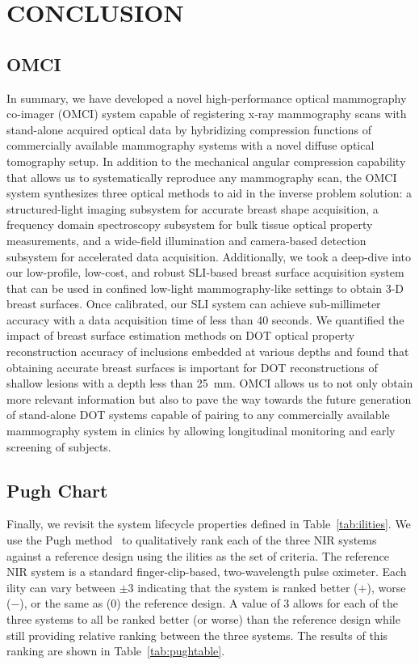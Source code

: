 \chapter{CONCLUSION} %
\label{chap:conclusion}

\section{OMCI}
In summary, we have developed a novel high-performance optical mammography co-imager (OMCI) system capable of registering x-ray mammography scans with stand-alone acquired optical data by hybridizing compression functions of commercially available mammography systems with a novel diffuse optical tomography setup. In addition to the mechanical angular compression capability that allows us to systematically reproduce any mammography scan, the OMCI system synthesizes three optical methods to aid in the inverse problem solution: a structured-light imaging subsystem for accurate breast shape acquisition, a frequency domain spectroscopy subsystem for bulk tissue optical property measurements, and a wide-field illumination and camera-based detection subsystem for accelerated data acquisition. Additionally, we took a deep-dive into our low-profile, low-cost, and robust SLI-based breast surface acquisition system that can be used in confined low-light mammography-like settings to obtain 3-D breast surfaces. Once calibrated, our SLI system can achieve sub-millimeter accuracy with a data acquisition time of less than 40 seconds. We quantified the impact of breast surface estimation methods on DOT optical property reconstruction accuracy of inclusions embedded at various depths and found that obtaining accurate breast surfaces is important for DOT reconstructions of shallow lesions with a depth less than 25~mm. OMCI allows us to not only obtain more relevant information but also to pave the way towards the future generation of stand-alone DOT systems capable of pairing to any commercially available mammography system in clinics by allowing longitudinal monitoring and early screening of subjects.



\section{Pugh Chart}

Finally, we revisit the system lifecycle properties defined in Table~\ref{tab:ilities}. We use the Pugh method~\cite{Pugh1981} to qualitatively rank each of the three \ac{NIR} systems against a reference design using the ilities as the set of criteria. The reference \ac{NIR} system is a standard finger-clip-based, two-wavelength pulse oximeter. Each ility can vary between $\pm3$ indicating that the system is ranked better ($+$), worse ($-$), or the same as ($0$) the reference design. A value of 3 allows for each of the three systems to all be ranked better (or worse) than the reference design while still providing relative ranking between the three systems. The results of this ranking are shown in Table~\ref{tab:pughtable}. 


